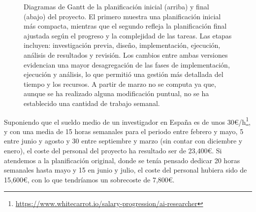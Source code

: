 \begin{figure}[!tbp]
    \centering
    \hfill
    \caption[Diagramas de Gantt de la planificación inicial y final del proyecto]{Diagramas de Gantt de la planificación inicial (arriba) y final (abajo) del proyecto. El primero muestra una planificación inicial más compacta, mientras que el segundo refleja la planificación final ajustada según el progreso y la complejidad de las tareas. Las etapas incluyen: investigación previa, diseño, implementación, ejecución, análisis de resultados y revisión. Los cambios entre ambas versiones evidencian una mayor desagregación de las fases de implementación, ejecución y análisis, lo que permitió una gestión más detallada del tiempo y los recursos. A partir de marzo no se computa ya que, aunque se ha realizado alguna modificación puntual, no se ha establecido una cantidad de trabajo semanal.}
    \label{fig:planesjunto}
\end{figure}

Suponiendo que el sueldo medio de un investigador en España es de unos 30€/h\footnote{\url{https://www.whitecarrot.io/salary-progression/ai-researcher}}, y con una media de 15 horas semanales para el periodo entre febrero y mayo, 5 entre junio y agosto y 30 entre septiembre y marzo (sin contar con diciembre y enero), el coste del personal del proyecto ha resultado ser de 23,400€. Si atendemos a la planificación original, donde se tenía pensado dedicar 20 horas semanales hasta mayo y 15 en junio y julio, el coste del personal hubiera sido de 15,600€, con lo que tendríamos un sobrecoste de 7,800€. 

